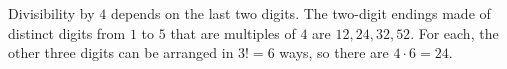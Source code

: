 Divisibility by $4$ depends on the last two digits. The two-digit endings made of distinct digits from $1$ to $5$ that are multiples of $4$ are $12,24,32,52$. For each, the other three digits can be arranged in $3!=6$ ways, so there are $4\cdot6=\boxed{24}$.
